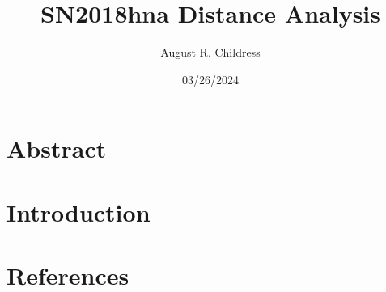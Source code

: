 \documentclass{article}
\author{August R. Childress}
\title{SN2018hna Distance Analysis}
\date{03/26/2024}
\begin{document}
\maketitle

\section{Abstract}

\section{Introduction}





\section{References}


\end{document}
